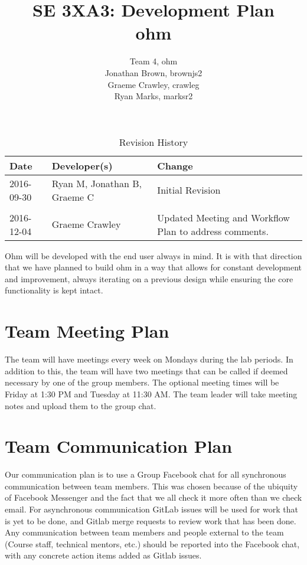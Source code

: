 \documentclass{article}
\title{SE 3XA3: Development Plan \\ohm}
\author{Team 4, ohm
		\\Jonathan Brown, brownjs2
		\\Graeme Crawley, crawleg
		\\Ryan Marks, marksr2
}
\date{}
\begin{document}
\begin{table}[hp]
\caption{Revision History} \label{TblRevisionHistory}
\begin{tabularx}{\textwidth}{llX}
\toprule
\textbf{Date} & \textbf{Developer(s)} & \textbf{Change}\\
\midrule
2016-09-30 & Ryan M, Jonathan B, Graeme C & Initial Revision\\ \\
2016-12-04 & Graeme Crawley & Updated Meeting and Workflow Plan to address comments.\\
\bottomrule
\end{tabularx}
\end{table}

\newpage

\maketitle

Ohm will be developed with the end user always in mind. It is with that direction that we have planned to build ohm in a way that allows for constant development and improvement, always iterating on a previous design while ensuring the core functionality is kept intact.

\section{Team Meeting Plan}
The team will have meetings every week on Mondays  during the lab periods. In addition to this, the team will have two meetings that can be called if deemed necessary by one of the group members. The optional meeting times will be Friday at 1:30 PM and Tuesday at 11:30 AM. The team leader will take meeting notes and upload them to the group chat.


\section{Team Communication Plan}

Our communication plan is to use a Group Facebook chat for all synchronous communication between team members.
This was chosen because of the ubiquity of Facebook Messenger and the fact that we all check it more often than we check email.
For asynchronous communication GitLab issues will be used for work that is yet to be done, and Gitlab merge requests to review work that has been done.
Any communication between team members and people external to the team (Course staff, technical mentors, etc.) should be reported into the Facebook chat, 
with any concrete action items added as Gitlab issues.
\end{document}
